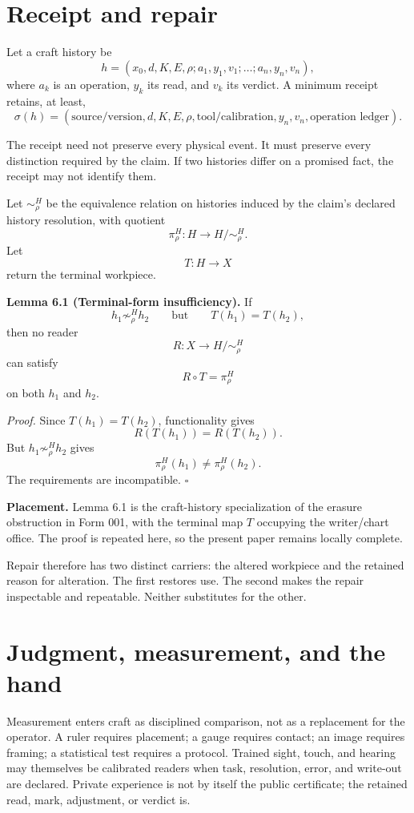 \documentclass[11pt]{article}
\begin{document}
\section{Receipt and repair}

Let a craft history be
\[
h=(x_0,d,K,E,\rho;
 a_1,y_1,v_1;\ldots;a_n,y_n,v_n),
\]
where $a_k$ is an operation, $y_k$ its read, and $v_k$ its verdict. A minimum receipt retains, at least,
\[
\sigma(h)=
(\text{source/version},d,K,E,\rho,
\text{tool/calibration},y_n,v_n,
\text{operation ledger}).
\]

The receipt need not preserve every physical event. It must preserve every distinction required by the claim. If two histories differ on a promised fact, the receipt may not identify them.

Let $\sim^H_\rho$ be the equivalence relation on histories induced by the claim's declared history resolution, with quotient
\[
\pi^H_\rho:H\longrightarrow H/{\sim^H_\rho}.
\]
Let
\[
T:H\longrightarrow X
\]
return the terminal workpiece.

\textbf{Lemma 6.1 (Terminal-form insufficiency).}
If
\[
h_1\not\sim^H_\rho h_2
\qquad\text{but}\qquad
T(h_1)=T(h_2),
\]
then no reader
\[
R:X\longrightarrow H/{\sim^H_\rho}
\]
can satisfy
\[
R\circ T=\pi^H_\rho
\]
on both $h_1$ and $h_2$.

\textit{Proof.}
Since $T(h_1)=T(h_2)$, functionality gives
\[
R(T(h_1))=R(T(h_2)).
\]
But $h_1\not\sim^H_\rho h_2$ gives
\[
\pi^H_\rho(h_1)\neq\pi^H_\rho(h_2).
\]
The requirements are incompatible. \hfill$\square$

\begin{lawbox}
\textbf{Placement.} Lemma 6.1 is the craft-history specialization of the erasure obstruction in Form 001, with the terminal map $T$ occupying the writer/chart office. The proof is repeated here, so the present paper remains locally complete.
\end{lawbox}

Repair therefore has two distinct carriers: the altered workpiece and the retained reason for alteration. The first restores use. The second makes the repair inspectable and repeatable. Neither substitutes for the other.

\section{Judgment, measurement, and the hand}

Measurement enters craft as disciplined comparison, not as a replacement for the operator. A ruler requires placement; a gauge requires contact; an image requires framing; a statistical test requires a protocol. Trained sight, touch, and hearing may themselves be calibrated readers when task, resolution, error, and write-out are declared. Private experience is not by itself the public certificate; the retained read, mark, adjustment, or verdict is.
\end{document}
